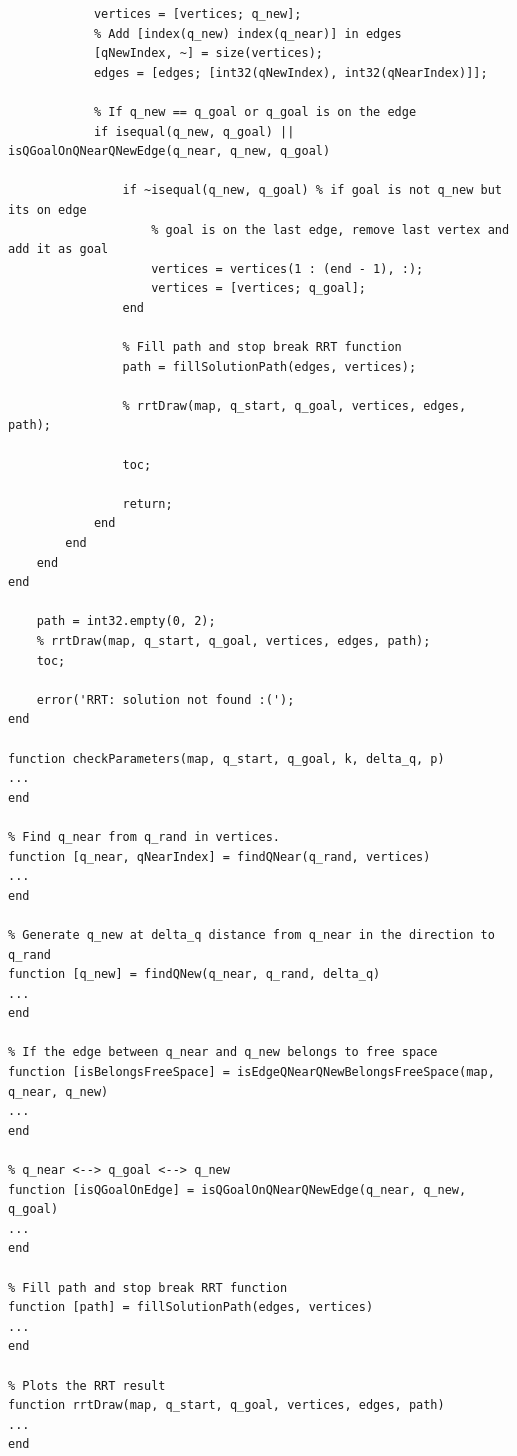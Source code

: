 \documentclass{article}
\begin{document}
\begin{lstlisting}[label=rrt-m, caption=rrt.m]
            % Add q_new in vertices 
            vertices = [vertices; q_new];
            % Add [index(q_new) index(q_near)] in edges
            [qNewIndex, ~] = size(vertices);
            edges = [edges; [int32(qNewIndex), int32(qNearIndex)]];
            
            % If q_new == q_goal or q_goal is on the edge
            if isequal(q_new, q_goal) || isQGoalOnQNearQNewEdge(q_near, q_new, q_goal)
                
                if ~isequal(q_new, q_goal) % if goal is not q_new but its on edge
                    % goal is on the last edge, remove last vertex and add it as goal
                    vertices = vertices(1 : (end - 1), :);
                    vertices = [vertices; q_goal];
                end
                
                % Fill path and stop break RRT function
                path = fillSolutionPath(edges, vertices);
                
                % rrtDraw(map, q_start, q_goal, vertices, edges, path);
                
                toc;
                
                return;
            end
        end
    end
end

    path = int32.empty(0, 2);
    % rrtDraw(map, q_start, q_goal, vertices, edges, path);
    toc;
    
    error('RRT: solution not found :(');
end

function checkParameters(map, q_start, q_goal, k, delta_q, p)
...
end

% Find q_near from q_rand in vertices.
function [q_near, qNearIndex] = findQNear(q_rand, vertices)
...
end

% Generate q_new at delta_q distance from q_near in the direction to q_rand
function [q_new] = findQNew(q_near, q_rand, delta_q)
...
end

% If the edge between q_near and q_new belongs to free space
function [isBelongsFreeSpace] = isEdgeQNearQNewBelongsFreeSpace(map, q_near, q_new)
...
end

% q_near <--> q_goal <--> q_new
function [isQGoalOnEdge] = isQGoalOnQNearQNewEdge(q_near, q_new, q_goal)
...
end

% Fill path and stop break RRT function
function [path] = fillSolutionPath(edges, vertices)
...
end

% Plots the RRT result
function rrtDraw(map, q_start, q_goal, vertices, edges, path)
...
end


	\end{lstlisting}
		
\end{document}
